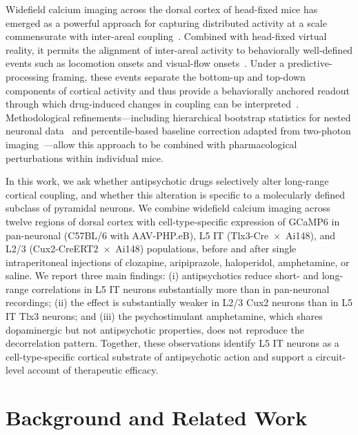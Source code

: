 Widefield calcium imaging across the dorsal cortex of head-fixed mice has emerged as a powerful approach for capturing distributed activity at a scale commensurate with inter-areal coupling~\cite{musall2019single, leinweber2017sensorimotor}. Combined with head-fixed virtual reality, it permits the alignment of inter-areal activity to behaviorally well-defined events such as locomotion onsets and visual-flow onsets~\cite{leinweber2017sensorimotor, keller2012sensorimotor, attinger2017visuomotor, keller2018predictive}. Under a predictive-processing framing, these events separate the bottom-up and top-down components of cortical activity and thus provide a behaviorally anchored readout through which drug-induced changes in coupling can be interpreted~\cite{keller2018predictive, zmarz2016mismatch}. Methodological refinements---including hierarchical bootstrap statistics for nested neuronal data~\cite{saravanan2020hierarchical} and percentile-based baseline correction adapted from two-photon imaging~\cite{dombeck2007imaging}---allow this approach to be combined with pharmacological perturbations within individual mice.

In this work, we ask whether antipsychotic drugs selectively alter long-range cortical coupling, and whether this alteration is specific to a molecularly defined subclass of pyramidal neurons. We combine widefield calcium imaging across twelve regions of dorsal cortex with cell-type-specific expression of GCaMP6 in pan-neuronal (C57BL/6 with AAV-PHP.eB), L5 IT (Tlx3-Cre~$\times$~Ai148), and L2/3 (Cux2-CreERT2~$\times$~Ai148) populations, before and after single intraperitoneal injections of clozapine, aripiprazole, haloperidol, amphetamine, or saline. We report three main findings: (i) antipsychotics reduce short- and long-range correlations in L5 IT neurons substantially more than in pan-neuronal recordings; (ii) the effect is substantially weaker in L2/3 Cux2 neurons than in L5 IT Tlx3 neurons; and (iii) the psychostimulant amphetamine, which shares dopaminergic but not antipsychotic properties, does not reproduce the decorrelation pattern. Together, these observations identify L5 IT neurons as a cell-type-specific cortical substrate of antipsychotic action and support a circuit-level account of therapeutic efficacy.

\section{Background and Related Work}

